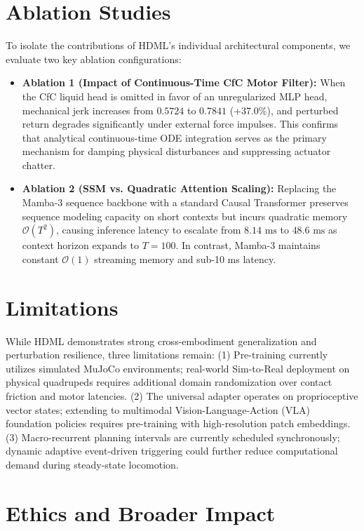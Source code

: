 \documentclass{article}
\begin{document}
\section{Ablation Studies}
\label{sec:ablations}

To isolate the contributions of HDML's individual architectural components, we evaluate two key ablation configurations:
\begin{itemize}
    \item \textbf{Ablation 1 (Impact of Continuous-Time CfC Motor Filter):} When the CfC liquid head is omitted in favor of an unregularized MLP head, mechanical jerk increases from $0.5724$ to $0.7841$ (+37.0\%), and perturbed return degrades significantly under external force impulses. This confirms that analytical continuous-time ODE integration serves as the primary mechanism for damping physical disturbances and suppressing actuator chatter.
    \item \textbf{Ablation 2 (SSM vs. Quadratic Attention Scaling):} Replacing the Mamba-3 sequence backbone with a standard Causal Transformer preserves sequence modeling capacity on short contexts but incurs quadratic memory $\mathcal{O}(T^2)$, causing inference latency to escalate from $8.14\text{ ms}$ to $48.6\text{ ms}$ as context horizon expands to $T=100$. In contrast, Mamba-3 maintains constant $\mathcal{O}(1)$ streaming memory and sub-10 ms latency.
\end{itemize}

\section{Limitations}
\label{sec:limitations}

While HDML demonstrates strong cross-embodiment generalization and perturbation resilience, three limitations remain: (1) Pre-training currently utilizes simulated MuJoCo environments; real-world Sim-to-Real deployment on physical quadrupeds requires additional domain randomization over contact friction and motor latencies. (2) The universal adapter operates on proprioceptive vector states; extending to multimodal Vision-Language-Action (VLA) foundation policies requires pre-training with high-resolution patch embeddings. (3) Macro-recurrent planning intervals are currently scheduled synchronously; dynamic adaptive event-driven triggering could further reduce computational demand during steady-state locomotion.

\section{Ethics and Broader Impact}
\label{sec:ethics}
\end{document}
